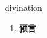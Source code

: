 
\begin{frame}
{\huge divination}
\begin{center}
\begin{enumerate}\Large
  \item \textbf{预言}
\end{enumerate}
\end{center}
\end{frame}
